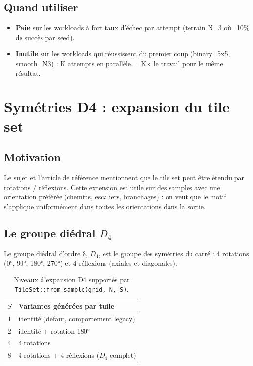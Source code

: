 \subsection{Quand utiliser}

\begin{itemize}
    \item \textbf{Paie} sur les workloads à fort taux d'échec par attempt (terrain N=3 où ~10\% de succès par seed).
    \item \textbf{Inutile} sur les workloads qui réussissent du premier coup (binary\_5x5, smooth\_N3) : K attempts en parallèle = K× le travail pour le même résultat.
\end{itemize}

\section{Symétries D4 : expansion du tile set}
\label{sec:ext:symmetries}

\subsection{Motivation}

Le sujet et l'article de référence \cite{heaton2018wfc} mentionnent que le tile set peut être étendu par rotations / réflexions. Cette extension est utile sur des samples avec une orientation préférée (chemins, escaliers, branchages) : on veut que le motif s'applique uniformément dans toutes les orientations dans la sortie.

\subsection{Le groupe diédral $D_4$}

\begin{definition}[Groupe $D_4$]
Le groupe diédral d'ordre 8, $D_4$, est le groupe des symétries du carré : 4 rotations (0°, 90°, 180°, 270°) et 4 réflexions (axiales et diagonales).
\end{definition}

\begin{table}[H]
\centering
\begin{tabular}{cl}
\toprule
$S$ & Variantes générées par tuile \\
\midrule
1 & identité (défaut, comportement legacy) \\
2 & identité + rotation 180° \\
4 & 4 rotations \\
8 & 4 rotations + 4 réflexions ($D_4$ complet) \\
\bottomrule
\end{tabular}
\caption{Niveaux d'expansion D4 supportés par \texttt{TileSet::from\_sample(grid, N, S)}.}
\label{tab:ext:symmetries_levels}
\end{table}

